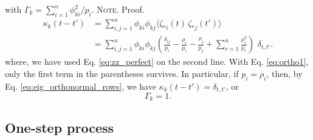 \documentclass[reprint, floatfix]{revtex4-1}
\newcommand{\note}[1]{{\color{DarkGreen}\footnotesize \textsc{Note.} #1}}
\begin{document}
with
$\Gamma_k = \sum_{ i = 1}^n \phi_{ki}^2 / p_i$.
\note{Proof.%
  $$
  \begin{aligned}
  \kappa_k(t - t')
  &=
  \sum_{i,j = 1}^n
  \phi_{ki}
  \phi_{kj}
    \langle \zeta_{*i}(t) \, \zeta_{*j}(t') \rangle
  \\
  &=
  \sum_{i,j = 1}^n
  \phi_{ki}
  \phi_{kj}
  \left(
    \frac{ \delta_{ij} } { p_i }
    -
    \frac{ \rho_i } { p_i }
    -
    \frac{ \rho_j } { p_j }
    +
    \sum_{r = 1}^n
    \frac{ \rho_r^2 } { p_r }
  \right) \,
  \, \delta_{t, t'}
  .
  \end{aligned}
  $$
  where,
  we have used
  Eq. \eqref{eq:zz_perfect}
  on the second line.
  With Eq. \eqref{eq:ortho1},
  only the first term in the parentheses survives.
}
In particular, if $p_i = \rho_i$, then, by
Eq. \eqref{eq:eig_orthonormal_rows}, we have
$\kappa_k(t - t') = \delta_{t, t'}$, or
\begin{equation}
  \Gamma_k = 1
  .
\label{eq:Gamma_perfect}
\end{equation}




\subsection{\label{sec:Gamma_onestep}
One-step process}
\end{document}
